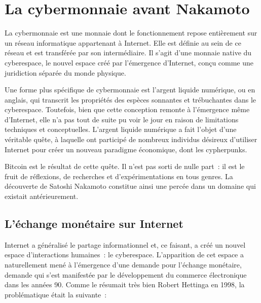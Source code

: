 
\chapter{La cybermonnaie avant Nakamoto}
\label{ch:cybermonnaie}

La cybermonnaie est une monnaie dont le fonctionnement repose entièrement sur un réseau informatique appartenant à Internet. Elle est définie au sein de ce réseau et est transférée par son intermédiaire. Il s'agit d'une monnaie native du cyberespace, le nouvel espace créé par l'émergence d'Internet, conçu comme une juridiction séparée du monde physique.

Une forme plus spécifique de cybermonnaie est l'argent liquide numérique, ou  en anglais, qui transcrit les propriétés des espèces sonnantes et trébuchantes dans le cyberespace. Toutefois, bien que cette conception remonte à l'émergence même d'Internet, elle n'a pas tout de suite pu voir le jour en raison de limitations techniques et conceptuelles. L'argent liquide numérique a fait l'objet d'une véritable quête, à laquelle ont participé de nombreux individus désireux d'utiliser Internet pour créer un nouveau paradigme économique, dont les cypherpunks.

Bitcoin est le résultat de cette quête. Il n'est pas sorti de nulle part~: il est le fruit de réflexions, de recherches et d'expérimentations en tous genres. La découverte de Satoshi Nakamoto constitue ainsi une percée dans un domaine qui existait antérieurement.

\section*{L'échange monétaire sur Internet}

Internet a généralisé le partage informationnel et, ce faisant, a créé un nouvel espace d'interactions humaines~: le cyberespace. L'apparition de cet espace a naturellement mené à l'émergence d'une demande pour l'échange monétaire, demande qui s'est manifestée par le développement du commerce électronique dans les années 90. Comme le résumait très bien Robert Hettinga en 1998, la problématique était la suivante~:

